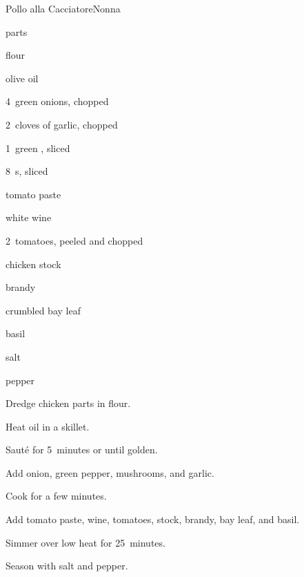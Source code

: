 \begin{recipe}{Pollo alla Cacciatore}{Nonna}{}

\begin{ingredients}
\item {}  parts
\item \C{\half} flour
\item {} olive oil
\item 4~green onions, chopped 
\item 2~cloves of garlic, chopped 
\item 1~green , sliced 
\item 8~s, sliced 
\item {} tomato paste
\item \C{\half} white wine
\item 2~tomatoes, peeled and chopped
\item \C{\threequarter} chicken stock
\item \C{\quarter} brandy
\item crumbled bay leaf
\item basil
\item salt
\item pepper
\end{ingredients}

\begin{directions}
\item Dredge chicken parts in flour.
\item Heat oil in a skillet.
\item Saut\'e for 5~minutes or until golden.
\item Add onion, green pepper, mushrooms, and garlic.
\item Cook for a few minutes.
\item Add tomato paste, wine, tomatoes, stock, brandy, bay leaf, and basil.
\item Simmer over low heat for 25~minutes.
\item Season with salt and pepper.
\end{directions}

\end{recipe}

